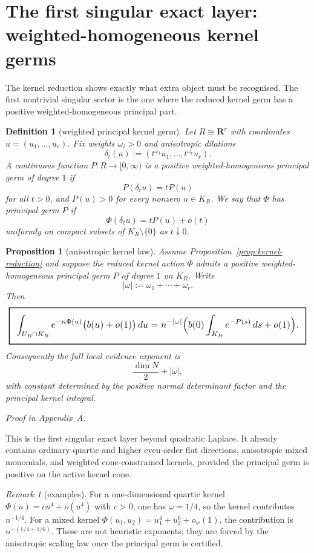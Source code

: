 \documentclass[11pt,a4paper]{article}
\numberwithin{equation}{section}
\newcommand{\R}{\mathbf R}
\newcommand{\geomboxed}[1]{%
  \setlength{\fboxsep}{8pt}%
  \setlength{\fboxrule}{0.9pt}%
  \fbox{\scalebox{1.12}{$\displaystyle #1$}}%
}
\theoremstyle{thmcompact}
\newtheorem{proposition}[theorem]{Proposition}
\newtheorem{definition}[theorem]{Definition}
\theoremstyle{remark}
\newtheorem*{remarkplain}{Remark}
\newenvironment{remark}[1][]%
{\begin{remarkbox}\begin{remarkplain}[#1]\normalfont}
{\end{remarkplain}\end{remarkbox}}
\newcommand{\proofappendix}{\par{\hfill\scriptsize\emph{Proof in Appendix~A.}}\par}
\begin{document}
\section{The first singular exact layer: weighted-homogeneous kernel germs}

The kernel reduction shows exactly what extra object must be recognised. The first nontrivial singular sector is the one where the reduced kernel germ has a positive weighted-homogeneous principal part.

\begin{definition}[weighted principal kernel germ]
Let $R\cong\R^r$ with coordinates $u=(u_1,\dots,u_r)$. Fix weights $\omega_i>0$ and anisotropic dilations
\[
\delta_t(u):=(t^{\omega_1}u_1,\dots,t^{\omega_r}u_r).
\]
A continuous function $P:R\to[0,\infty)$ is a \emph{positive weighted-homogeneous principal germ of degree $1$} if
\[
P(\delta_t u)=tP(u)
\]
for all $t>0$, and $P(u)>0$ for every nonzero $u\in K_R$. We say that $\Phi$ has principal germ $P$ if
\[
\Phi(\delta_t u)=tP(u)+o(t)
\]
uniformly on compact subsets of $K_R\setminus\{0\}$ as $t\downarrow 0$.
\end{definition}

\begin{proposition}[anisotropic kernel law]\label{prop:anisotropic-kernel}
Assume Proposition~\ref{prop:kernel-reduction} and suppose the reduced kernel action $\Phi$ admits a positive weighted-homogeneous principal germ $P$ of degree $1$ on $K_R$. Write
\[
|\omega|:=\omega_1+\cdots+\omega_r.
\]
Then
\[
\geomboxed{
\int_{U_R\cap K_R} e^{-n\Phi(u)}\bigl(b(u)+o(1)\bigr)\,du
=
 n^{-|\omega|}
\Bigl(b(0)\int_{K_R} e^{-P(s)}\,ds + o(1)\Bigr).}
\]
Consequently the full local evidence exponent is
\[
\frac{\dim N}{2}+|\omega|,
\]
with constant determined by the positive normal determinant factor and the principal kernel integral.
\proofappendix
\end{proposition}

This is the first singular exact layer beyond quadratic Laplace. It already contains ordinary quartic and higher even-order flat directions, anisotropic mixed monomials, and weighted cone-constrained kernels, provided the principal germ is positive on the active kernel cone.

\begin{remark}[examples]
For a one-dimensional quartic kernel $\Phi(u)=cu^4+o(u^4)$ with $c>0$, one has $\omega=1/4$, so the kernel contributes $n^{-1/4}$. For a mixed kernel $\Phi(u_1,u_2)=u_1^4+u_2^6+o_w(1)$, the contribution is $n^{-(1/4+1/6)}$. These are not heuristic exponents; they are forced by the anisotropic scaling law once the principal germ is certified.
\end{remark}
\end{document}
